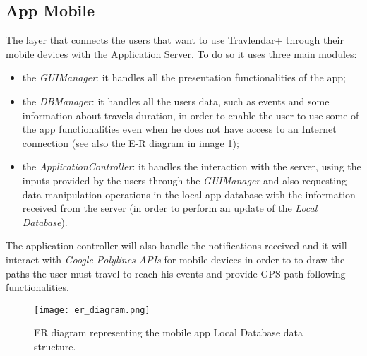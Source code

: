 \subsection{App Mobile}
\label{subsect:App Mobile}
	The layer that connects the users that want to use Travlendar+ through their mobile devices with the Application Server.
	To do so it uses three main modules: 
	\begin{itemize}
	\item the \textit{GUIManager}: it handles all the presentation functionalities of the app;
	\item the \textit{DBManager}: it handles all the users data, such as events and some information about travels duration, in order to enable the user to use some of the app functionalities even when he does not have access to an Internet connection (see also the E-R diagram in image \ref{fig:localDB});
	\item the \textit{ApplicationController}: it handles the interaction with the server, using the inputs provided by the users through the \textit{GUIManager} and also requesting data manipulation operations in the local app database with the information received from the server (in order to perform an update of the \textit{Local Database}).
	\end{itemize}
	The application controller will also handle the notifications received and it will interact with \textit{Google Polylines APIs} for mobile devices in order to to draw the paths the user must travel to reach his events and provide GPS path following functionalities.
\begin{figure} [H]
	\begin{center}
		\hspace*{-10pt}
		\texttt{[image: er\_diagram.png]}
	\end{center}
	\caption{ER diagram representing the mobile app Local Database data structure.}
	\label{fig:localDB}
\end{figure}
\newpage